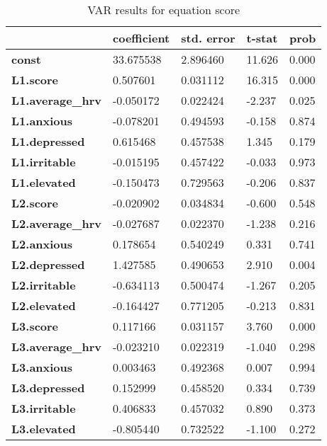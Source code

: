\documentclass{article}
\begin{document}
\begin{table}[!ht]
    \centering
    \begin{tabular}{lllll}
      \toprule\
        ~ & \textbf{coefficient} & \textbf{std. error} & \textbf{t-stat} & \textbf{prob} \\ \midrule
        \textbf{const} & 33.675538 & 2.896460 & 11.626 & 0.000 \\ 
        \textbf{L1.score} & 0.507601 & 0.031112 & 16.315 & 0.000 \\ 
        \textbf{L1.average\_hrv} & -0.050172 & 0.022424 & -2.237 & 0.025 \\ 
        \textbf{L1.anxious} & -0.078201 & 0.494593 & -0.158 & 0.874 \\ 
        \textbf{L1.depressed} & 0.615468 & 0.457538 & 1.345 & 0.179 \\ 
        \textbf{L1.irritable} & -0.015195 & 0.457422 & -0.033 & 0.973 \\ 
        \textbf{L1.elevated} & -0.150473 & 0.729563 & -0.206 & 0.837 \\ 
        \textbf{L2.score} & -0.020902 & 0.034834 & -0.600 & 0.548 \\ 
        \textbf{L2.average\_hrv} & -0.027687 & 0.022370 & -1.238 & 0.216 \\ 
        \textbf{L2.anxious} & 0.178654 & 0.540249 & 0.331 & 0.741 \\ 
        \textbf{L2.depressed} & 1.427585 & 0.490653 & 2.910 & 0.004 \\ 
        \textbf{L2.irritable} & -0.634113 & 0.500474 & -1.267 & 0.205 \\ 
        \textbf{L2.elevated} & -0.164427 & 0.771205 & -0.213 & 0.831 \\ 
        \textbf{L3.score} & 0.117166 & 0.031157 & 3.760 & 0.000 \\ 
        \textbf{L3.average\_hrv} & -0.023210 & 0.022319 & -1.040 & 0.298 \\ 
        \textbf{L3.anxious} & 0.003463 & 0.492368 & 0.007 & 0.994 \\ 
        \textbf{L3.depressed} & 0.152999 & 0.458520 & 0.334 & 0.739 \\ 
        \textbf{L3.irritable} & 0.406833 & 0.457032 & 0.890 & 0.373 \\ 
        \textbf{L3.elevated} & -0.805440 & 0.732522 & -1.100 & 0.272 \\ \bottomrule
    \end{tabular}
    \caption{VAR results for equation score}
    \label{VAR Score Results}
\end{table}
\end{document}
